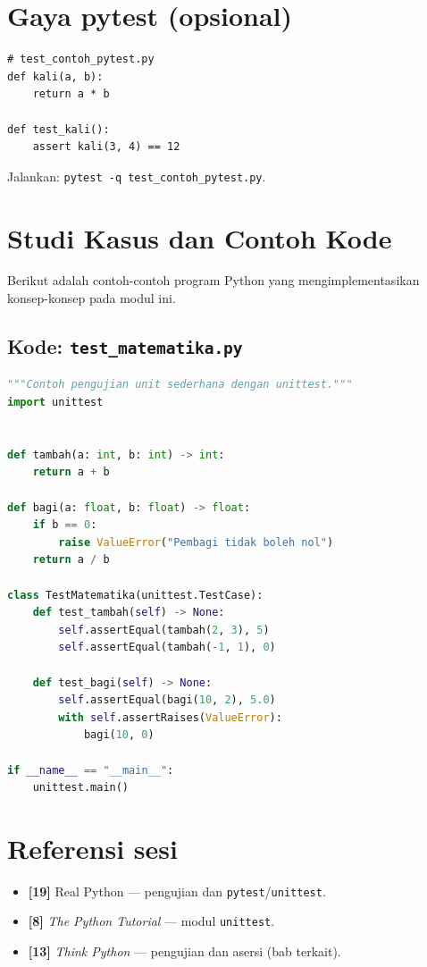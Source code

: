 \documentclass[../main.tex]{subfiles}
\begin{document}
\section{Gaya pytest (opsional)}

\begin{lstlisting}[caption=pytest ringkas]
# test_contoh_pytest.py
def kali(a, b):
    return a * b

def test_kali():
    assert kali(3, 4) == 12
\end{lstlisting}

\noindent Jalankan: \texttt{pytest -q test\_contoh\_pytest.py}.

\section{Studi Kasus dan Contoh Kode}

Berikut adalah contoh-contoh program Python yang mengimplementasikan konsep-konsep pada modul ini.

\subsection{Kode: \texttt{test\_matematika.py}}
\begin{lstlisting}[language=Python,caption={\texttt{test\_matematika.py}}]
"""Contoh pengujian unit sederhana dengan unittest."""
import unittest


def tambah(a: int, b: int) -> int:
    return a + b

def bagi(a: float, b: float) -> float:
    if b == 0:
        raise ValueError("Pembagi tidak boleh nol")
    return a / b

class TestMatematika(unittest.TestCase):
    def test_tambah(self) -> None:
        self.assertEqual(tambah(2, 3), 5)
        self.assertEqual(tambah(-1, 1), 0)

    def test_bagi(self) -> None:
        self.assertEqual(bagi(10, 2), 5.0)
        with self.assertRaises(ValueError):
            bagi(10, 0)

if __name__ == "__main__":
    unittest.main()
\end{lstlisting}

\section{Referensi sesi}

\begin{itemize}[leftmargin=*]
  \item \textbf{[19]} Real Python --- pengujian dan \texttt{pytest}/\texttt{unittest}.
  \item \textbf{[8]} \textit{The Python Tutorial} --- modul \texttt{unittest}.
  \item \textbf{[13]} \textit{Think Python} --- pengujian dan asersi (bab terkait).
\end{itemize}
\end{document}

